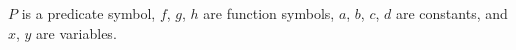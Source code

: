 $P$ is a predicate symbol, $f$, $g$, $h$ are function symbols, $a$, $b$, $c$, $d$ are constants, and $x$, $y$ are variables.